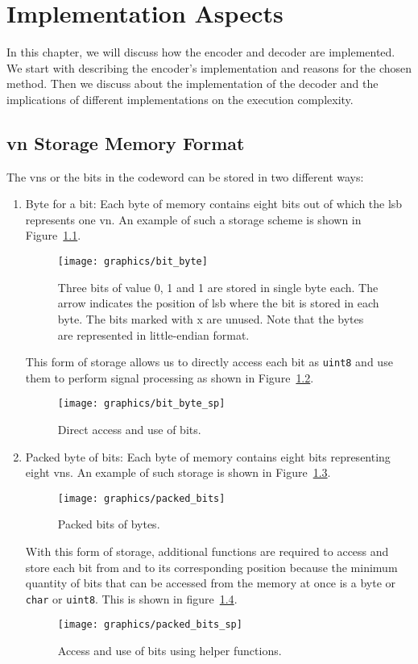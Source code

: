 \chapter{Implementation Aspects}
In this chapter, we will discuss how the encoder and decoder are implemented. We start with describing the encoder's implementation and reasons for the chosen method. Then we discuss about the implementation of the decoder and the implications of different implementations on the execution complexity.
\section{\acrlong{vn} Storage Memory Format}
The \glspl{vn} or the bits in the codeword can be stored in two different ways:
\begin{enumerate}
  \item Byte for a bit: Each byte of memory contains eight bits out of which the \gls{lsb} represents one \gls{vn}. An example of such a storage scheme is shown in Figure~\ref{fig:bit_byte}.
  \begin{figure}[htbp]
    \centering
    \texttt{[image: graphics/bit\_byte]}
    \caption{Three bits of value 0, 1 and 1 are stored in single byte each. The arrow indicates the position of \gls{lsb} where the bit is stored in each byte. The bits marked with x are unused. Note that the bytes are represented in little-endian format.}
    \label{fig:bit_byte}
  \end{figure}
  This form of storage allows us to directly access each bit as \texttt{uint8} and use them to perform signal processing as shown in Figure~\ref{fig:bit_byte_sp}.
  \begin{figure}[htbp]
    \centering
    \texttt{[image: graphics/bit\_byte\_sp]}
    \caption{Direct access and use of bits.}
    \label{fig:bit_byte_sp}
  \end{figure}
  \item Packed byte of bits: Each byte of memory contains eight bits representing eight \glspl{vn}. An example of such storage is shown in Figure~\ref{fig:packed_bits}.
  \begin{figure}[htbp]
    \centering
    \texttt{[image: graphics/packed\_bits]}
    \caption{Packed bits of bytes.}
    \label{fig:packed_bits}
  \end{figure}
  With this form of storage, additional functions are required to access and store each bit from and to its corresponding position because the minimum quantity of bits that can be accessed from the memory at once is a byte or \texttt{char} or \texttt{uint8}. This is shown in figure~\ref{fig:packed_spb}.
  \begin{figure}[htbp]
    \centering
    \texttt{[image: graphics/packed\_bits\_sp]}
    \caption{Access and use of bits using helper functions.}
    \label{fig:packed_spb}
  \end{figure}
\end{enumerate}
